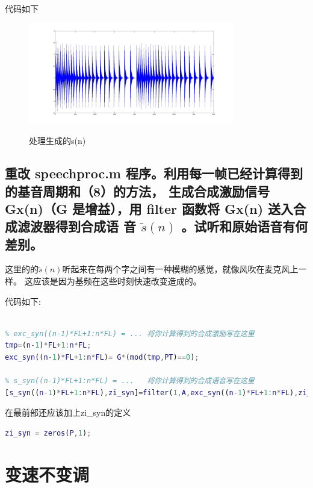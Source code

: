 \documentclass{ctexart}
\begin{document}
代码如下


\begin{figure}
    \centering
    \includegraphics[width=0.8\textwidth]{9wave.jpg}\\
    \caption{处理生成的s(n)\label{9wave}}
\end{figure}

\subsection{
重改 speechproc.m 程序。利用每一帧已经计算得到的基音周期和（8）的方法，
生成合成激励信号 Gx(n)（G 是增益），用 filter 函数将 Gx(n) 送入合成滤波器得到合成语
音 $\tilde{s}(n)$ 。试听和原始语音有何差别。
}
这里的的$\tilde{s}(n)$听起来在每两个字之间有一种模糊的感觉，就像风吹在麦克风上一样。
这应该是因为基频在这些时刻快速改变造成的。

代码如下:
\begin{lstlisting}[language=matlab]
% (10) 在此位置写程序，生成合成激励，并用激励和filter 函数产生合成语音

% exc_syn((n-1)*FL+1:n*FL) = ... 将你计算得到的合成激励写在这里
tmp=(n-1)*FL+1:n*FL;
exc_syn((n-1)*FL+1:n*FL)= G*(mod(tmp,PT)==0);

% s_syn((n-1)*FL+1:n*FL) = ...   将你计算得到的合成语音写在这里
[s_syn((n-1)*FL+1:n*FL),zi_syn]=filter(1,A,exc_syn((n-1)*FL+1:n*FL),zi_syn);
\end{lstlisting}

在最前部还应该加上zi\_syn的定义
\begin{lstlisting}[language=matlab]
zi_syn = zeros(P,1);
\end{lstlisting}

\section{变速不变调}
\setcounter{subsection}{10} 
\end{document}
